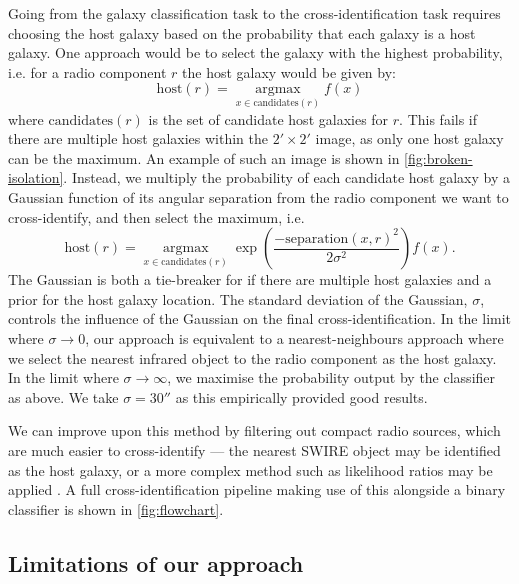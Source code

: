 \documentclass[fleqn,usenatbib,usedcolumn]{mnras}
\newcommand{\underset}[2]{\mathop{#2}\limits_{#1}}
\begin{document}
    Going from the galaxy classification task to the cross-identification task
    requires choosing the host galaxy based on the probability that each
    galaxy is a host galaxy. One approach would be to select the galaxy with
    the highest probability, i.e. for a radio component $r$ the host galaxy would be given by:
    \[
       \text{host}(r) = \underset{x \in \text{candidates}(r)}{\text{argmax}} f(x)
    \]
    where $\text{candidates}(r)$ is the set of candidate host galaxies for
    $r$. This fails if there are multiple host galaxies within the $2' \times
    2'$ image, as only one host galaxy can be the maximum. An example of such
    an image is shown in \autoref{fig:broken-isolation}. Instead, we multiply
    the probability of each candidate host galaxy by a Gaussian function of
    its angular separation from the radio component we want to cross-identify,
    and then select the maximum, i.e.
    \[
      \text{host}(r) = \underset{x \in \text{candidates}(r)}{\text{argmax}} \exp\left(\frac{-\text{separation}(x, r)^2}{2\sigma^2}\right) f(x).
    \]
    The Gaussian is both a tie-breaker for if there are multiple host galaxies
    and a prior for the host galaxy location. The standard deviation of the
    Gaussian, $\sigma$, controls the influence of the Gaussian on the final
    cross-identification. In the limit where $\sigma \to 0$, our approach is
    equivalent to a nearest-neighbours approach where we select the nearest
    infrared object to the radio component as the host galaxy. In the limit
    where $\sigma \to \infty$, we maximise the probability output by the
    classifier as above. We take $\sigma = 30''$ as this empirically provided
    good results.

    We can improve upon this method by filtering out compact radio sources,
    which are much easier to cross-identify --- the nearest SWIRE object may
    be identified as the host galaxy, or a more complex method such as
    likelihood ratios may be applied \citep[see][]{weston17}. A full
    cross-identification pipeline making use of this alongside a binary
    classifier is shown in \autoref{fig:flowchart}.

  \subsection{Limitations of our approach}
    \label{sec:limitations}
\end{document}
